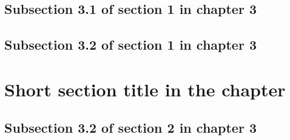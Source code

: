 \subsection{Subsection 3.1 of section 1 in chapter 3}
\lipsum[5-7]

\subsection{Subsection 3.2 of section 1 in chapter 3}
\lipsum[8-9]

\clearpage{} %
\section[Long section title displayed in the table of content]{Short section title in the chapter}
\lipsum[11-20]

\subsection{Subsection 3.2 of section 2 in chapter 3}
\lipsum[13-14]


{}
\specialsection %
\headerspecialsection

{\hypersetup{urlcolor=ntnu,linkcolor=sophia} %


}